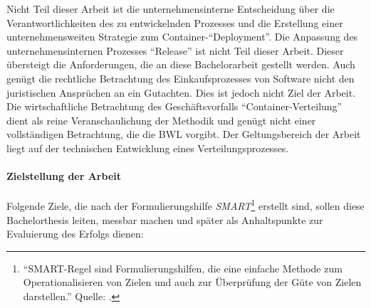 \par
Nicht Teil dieser Arbeit ist die unternehmensinterne Entscheidung über die Verantwortlichkeiten des zu entwickelnden Prozesses und die Erstellung einer unternehmensweiten Strategie zum Container-\enquote{Deployment}. Die Anpassung des unternehmensinternen Prozesses \enquote{Release} ist nicht Teil dieser Arbeit. Dieser übersteigt die Anforderungen, die an diese Bachelorarbeit gestellt werden. Auch genügt die rechtliche Betrachtung des Einkaufsprozesses von Software nicht den juristischen Ansprüchen an ein Gutachten. Dies ist jedoch nicht Ziel der Arbeit. Die wirtschaftliche Betrachtung des Geschäftsvorfalls  \enquote{Container-Verteilung} dient als reine Veranschaulichung der Methodik und genügt nicht einer vollständigen Betrachtung, die die \ac{BWL} vorgibt. Der Geltungsbereich der Arbeit liegt auf der technischen Entwicklung eines Verteilungsprozesses.

\paragraph{Zielstellung der Arbeit}\label{kap:einleitung:Ziele}
Folgende Ziele, die nach der Formulierungshilfe \textit{SMART}\footnote{\enquote{SMART-Regel sind Formulierungshilfen, die eine einfache Methode zum Operationalisieren von Zielen und auch zur Überprüfung der Güte von Zielen darstellen.} Quelle: \cite[][S.\,69]{dechange_projektmanagement_2020}.} erstellt sind, sollen diese Bachelorthesis leiten, messbar machen und später als Anhaltspunkte zur Evaluierung des Erfolgs dienen:

